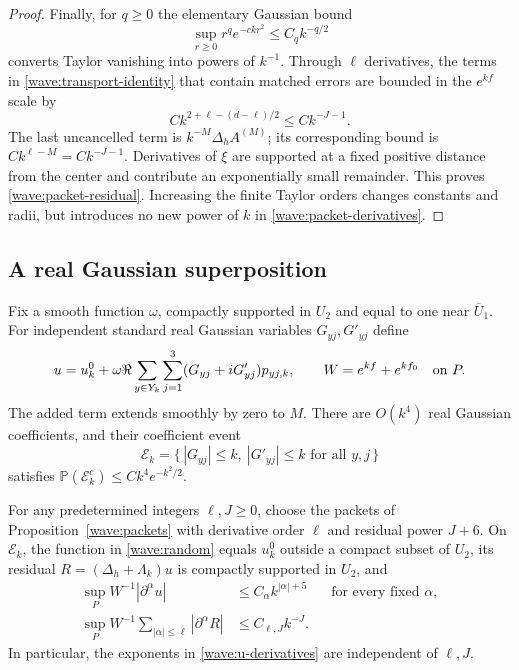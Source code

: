 \begin{proof}
Finally, for $q\ge0$ the elementary Gaussian bound
\[
 \sup_{r\ge0}r^q e^{-ckr^2}\le C_q k^{-q/2}
\]
converts Taylor vanishing into powers of $k^{-1}$. Through $\ell$
derivatives, the terms in \eqref{wave:transport-identity} that contain
matched errors are bounded in the $e^{kf}$ scale by
\[
 C k^{2+\ell-(d-\ell)/2}\le Ck^{-J-1}.
\]
The last uncancelled term is $k^{-M}\Delta_h A^{(M)}$; its corresponding
bound is $Ck^{\ell-M}=Ck^{-J-1}$. Derivatives of $\xi$ are supported
at a fixed positive distance from the center and contribute an
exponentially small remainder. This proves
\eqref{wave:packet-residual}. Increasing the finite Taylor orders
changes constants and radii, but introduces no new power of $k$ in
\eqref{wave:packet-derivatives}.
\end{proof}

\subsection{A real Gaussian superposition}

Fix a smooth function $\omega$, compactly supported in $U_2$ and equal
to one near $\overline U_1$. For independent standard real Gaussian
variables $G_{yj},G'_{yj}$ define
\begin{equation}
 u=u_k^0+\omega\Re\sum_{y\in Y_k}\sum_{j=1}^3
             (G_{yj}+iG'_{yj})p_{yj,k},
 \qquad W=e^{kf}+e^{kf_0}\quad\hbox{on }P.
 \label{wave:random}
\end{equation}
The added term extends smoothly by zero to $M$. There are $O(k^4)$
real Gaussian coefficients, and their coefficient event
\[
 \mathcal E_k=\{\,|G_{yj}|\le k,\ |G'_{yj}|\le k
                         \text{ for all }y,j\,\}
\]
satisfies $\mathbb P(\mathcal E_k^c)\le Ck^4e^{-k^2/2}$.

\begin{lemma}\label{wave:residual}
For any predetermined integers $\ell,J\ge0$, choose the packets of
Proposition~\ref{wave:packets} with derivative order $\ell$ and residual
power $J+6$. On $\mathcal E_k$, the function in
\eqref{wave:random} equals $u_k^0$ outside a compact subset of $U_2$,
its residual $R=(\Delta_h+\Lambda_k)u$ is compactly supported in $U_2$,
and
\begin{align}
 \sup_P W^{-1}|\partial^\alpha u|
      &\le C_\alpha k^{|\alpha|+5}
          &&\text{for every fixed }\alpha,\label{wave:u-derivatives}\\
 \sup_P W^{-1}\sum_{|\alpha|\le\ell}|\partial^\alpha R|
      &\le C_{\ell,J}k^{-J}.
          \label{wave:weighted-residual}
\end{align}
In particular, the exponents in \eqref{wave:u-derivatives} are
independent of $\ell,J$.
\end{lemma}

